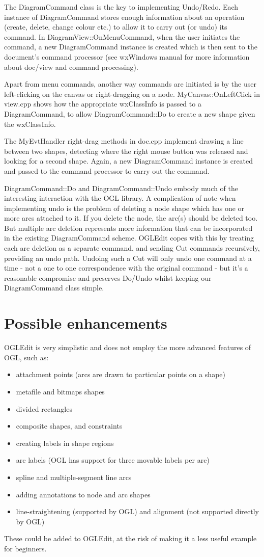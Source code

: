 The DiagramCommand class is the key to implementing Undo/Redo. Each instance of DiagramCommand
stores enough information about an operation (create, delete, change colour etc.) to allow
it to carry out (or undo) its command. In DiagramView::OnMenuCommand, when the user initiates the
command, a new DiagramCommand instance is created which is then sent to the document's
command processor (see wxWindows manual for more information about doc/view and command
processing).

Apart from menu commands, another way commands are initiated is by the user left-clicking on
the canvas or right-dragging on a node. MyCanvas::OnLeftClick in view.cpp shows how
the appropriate wxClassInfo is passed to a DiagramCommand, to allow DiagramCommand::Do
to create a new shape given the wxClassInfo.

The MyEvtHandler right-drag methods in doc.cpp implement drawing a line between
two shapes, detecting where the right mouse button was released and looking for a second
shape. Again, a new DiagramCommand instance is created and passed to the command
processor to carry out the command.

DiagramCommand::Do and DiagramCommand::Undo embody much of the
interesting interaction with the OGL library. A complication of note
when implementing undo is the problem of deleting a node shape which has
one or more arcs attached to it. If you delete the node, the arc(s)
should be deleted too. But multiple arc deletion represents more information
that can be incorporated in the existing DiagramCommand scheme. OGLEdit
copes with this by treating each arc deletion as a separate command, and
sending Cut commands recursively, providing an undo path. Undoing such a
Cut will only undo one command at a time - not a one to one
correspondence with the original command - but it's a reasonable
compromise and preserves Do/Undo whilst keeping our DiagramCommand class
simple.

\section{Possible enhancements}

OGLEdit is very simplistic and does not employ the more advanced features
of OGL, such as:

\begin{itemize}\itemsep=0pt
\item attachment points (arcs are drawn to particular points on a shape)
\item metafile and bitmaps shapes
\item divided rectangles
\item composite shapes, and constraints
\item creating labels in shape regions
\item arc labels (OGL has support for three movable labels per arc)
\item spline and multiple-segment line arcs
\item adding annotations to node and arc shapes
\item line-straightening (supported by OGL) and alignment (not supported directly by OGL)
\end{itemize}

These could be added to OGLEdit, at the risk of making it a less
useful example for beginners.
